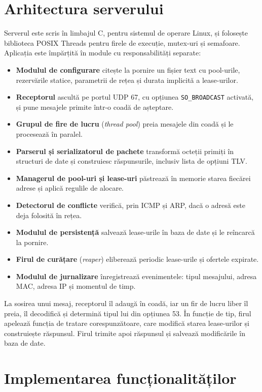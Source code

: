 \documentclass[conference]{IEEEtran}
\begin{document}
\section{Arhitectura serverului}\label{sec:arhitectura}
Serverul este scris în limbajul C, pentru sistemul de operare Linux, și folosește biblioteca POSIX Threads pentru firele de execuție, mutex-uri și semafoare. Aplicația este împărțită în module cu responsabilități separate:
\begin{itemize}
\item \textbf{Modulul de configurare} citește la pornire un fișier text cu pool-urile, rezervările statice, parametrii de rețea și durata implicită a lease-urilor.
\item \textbf{Receptorul} ascultă pe portul UDP 67, cu opțiunea \texttt{SO\_BROADCAST} activată, și pune mesajele primite într-o coadă de așteptare.
\item \textbf{Grupul de fire de lucru} (\textit{thread pool}) preia mesajele din coadă și le procesează în paralel.
\item \textbf{Parserul și serializatorul de pachete} transformă octeții primiți în structuri de date și construiesc răspunsurile, inclusiv lista de opțiuni TLV.
\item \textbf{Managerul de pool-uri și lease-uri} păstrează în memorie starea fiecărei adrese și aplică regulile de alocare.
\item \textbf{Detectorul de conflicte} verifică, prin ICMP și ARP, dacă o adresă este deja folosită în rețea.
\item \textbf{Modulul de persistență} salvează lease-urile în baza de date și le reîncarcă la pornire.
\item \textbf{Firul de curățare} (\textit{reaper}) eliberează periodic lease-urile și ofertele expirate.
\item \textbf{Modulul de jurnalizare} înregistrează evenimentele: tipul mesajului, adresa MAC, adresa IP și momentul de timp.
\end{itemize}

La sosirea unui mesaj, receptorul îl adaugă în coadă, iar un fir de lucru liber îl preia, îl decodifică și determină tipul lui din opțiunea 53. În funcție de tip, firul apelează funcția de tratare corespunzătoare, care modifică starea lease-urilor și construiește răspunsul. Firul trimite apoi răspunsul și salvează modificările în baza de date.

\section{Implementarea funcționalităților}\label{sec:implementare}
\end{document}
